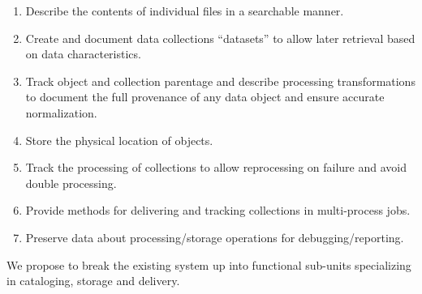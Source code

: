 \documentclass[../main-v1.tex]{subfiles}
\begin{document}
\begin{enumerate}

\item	Describe the contents of individual files in a searchable manner. 

\item	Create and document data collections ``datasets'' to allow later retrieval based on data characteristics.

 \item	Track object and collection parentage and describe processing transformations to document the full provenance of any data object and ensure accurate normalization.


 \item	Store the physical  location of objects.

 \item	Track the processing of collections to allow reprocessing on failure and avoid double processing.

 \item	Provide methods for delivering and tracking collections in multi-process jobs.

 \item	Preserve data about processing/storage operations for debugging/reporting.

\end{enumerate}
 We propose to break the existing system up into functional sub-units specializing in cataloging, storage and delivery. 
\end{document}
